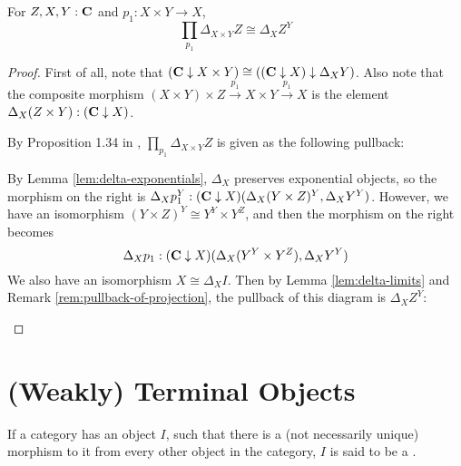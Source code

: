 \begin{lemma}\label{lem:constant-dependent-product}
  For $ Z, X, Y : \mathbf{C} $ and $ p_1 : X \times Y \to X $,
  \[ \prod_{p_1} \Delta_{X \times Y} Z \cong \Delta_X Z^Y \]
\end{lemma}
\begin{proof}
  First of all, note that $ (\mathbf{C} \downarrow X \times Y) \cong ((\mathbf{C} \downarrow X) \downarrow \Delta_X Y) $. Also note that the composite morphism $ (X \times Y) \times Z \xrightarrow{p_1} X \times Y \xrightarrow{p_1} X $ is the element $ \Delta_X (Z \times Y) : (\mathbf{C} \downarrow X) $.

  By Proposition 1.34 in \autocite{freyd}, $ \prod_{p_1} \Delta_{X \times Y} Z $ is given as the following pullback:
  \begin{center}
  \end{center}

  By Lemma \ref{lem:delta-exponentials}, $ \Delta_X $ preserves exponential objects, so the morphism on the right is $ \Delta_X p_1^Y : (\mathbf{C} \downarrow X)(\Delta_X (Y \times Z)^Y, \Delta_X Y^Y) $. However, we have an isomorphism $ (Y \times Z)^Y \cong Y^Y \times Y^Z $, and then the morphism on the right becomes
  \[ \Delta_X p_1 : (\mathbf{C} \downarrow X)(\Delta_X(Y^Y \times Y^Z), \Delta_X Y^Y) \]
  We also have an isomorphism $ X \cong \Delta_X I $. Then by Lemma \ref{lem:delta-limits} and Remark \ref{rem:pullback-of-projection}, the pullback of this diagram is $ \Delta_X Z^Y $:
  \begin{center}
  \end{center}
\end{proof}


\section{(Weakly) Terminal Objects}
\begin{definition}
  If a category has an object $ I $, such that there is a (not necessarily unique) morphism to it from every other object in the category, $ I $ is said to be a .
\end{definition}

